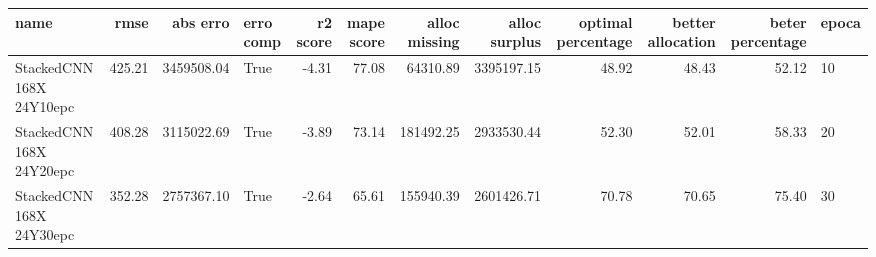 \begin{tabular}{lrrlrrrrrrrl}
\toprule
name & rmse & abs erro & erro comp & r2 score & mape score & alloc missing & alloc surplus & optimal percentage & better allocation & beter percentage & epoca \\
\midrule
StackedCNN 168X 24Y10epc & 425.21 & 3459508.04 & True & -4.31 & 77.08 & 64310.89 & 3395197.15 & 48.92 & 48.43 & 52.12 & 10 \\
StackedCNN 168X 24Y20epc & 408.28 & 3115022.69 & True & -3.89 & 73.14 & 181492.25 & 2933530.44 & 52.30 & 52.01 & 58.33 & 20 \\
StackedCNN 168X 24Y30epc & 352.28 & 2757367.10 & True & -2.64 & 65.61 & 155940.39 & 2601426.71 & 70.78 & 70.65 & 75.40 & 30 \\
\bottomrule
\end{tabular}
